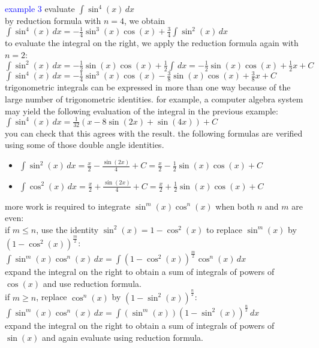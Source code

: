 \documentclass{article}
\begin{document}
\textcolor{blue}{example 3} evaluate $\int\sin^4(x)\,dx$\\
by reduction formula with $n = 4$, we obtain\\
$\int\sin^4(x)\,dx = -\frac{1}{4}\sin^3(x)\cos(x) + \frac{3}{4}\int\sin^2(x)\,dx$\\ to evaluate the integral on the right, we apply the reduction formula again with $n = 2$:\\ $\int\sin^2(x)\,dx = -\frac{1}{2}\sin(x)\cos(x) + \frac{1}{2}\int\,dx = -\frac{1}{2}\sin(x)\cos(x) + \frac{1}{2}x + C$\\ $\int\sin^4(x)\,dx = -\frac{1}{4}\sin^3(x)\cos(x) - \frac{3}{8}\sin(x)\cos(x) + \frac{3}{8}x + C$\\ trigonometric integrals can be expressed in more than one way because of the large number of trigonometric identities. for example, a computer algebra system may yield the following evaluation of the integral in the previous example:\\ $\int\sin^4(x)\,dx = \frac{1}{32}(x - 8\sin(2x) + \sin(4x)) + C$\\ you can check that this agrees with the result. the following formulas are verified using some of those double angle identities.
	\begin{itemize}
		\item $\int\sin^2(x)\,dx = \frac{x}{2} - \frac{\sin(2x)}{4} + C = \frac{x}{2} - \frac{1}{2}\sin(x)\cos(x) + C$
		\item $\int\cos^2(x)\,dx = \frac{x}{2} + \frac{\sin(2x)}{4} + C = \frac{x}{2} + \frac{1}{2}\sin(x)\cos(x) + C$ 
	\end{itemize}
more work is required to integrate $\sin^m(x)\cos^n(x)$ when both $n$ and $m$ are even:\\ if $m \leq n$, use the identity $\sin^2(x) = 1 - \cos^2(x)$ to replace $\sin^m(x)$ by $(1 - \cos^2(x))^{\frac{m}{2}}$:\\ $\int\sin^m(x)\cos^n(x)\,dx = \int(1 - \cos^2(x))^{\frac{m}{2}}\cos^n(x)\,dx$\\ expand the integral on the right to obtain a sum of integrals of powers of $\cos(x)$ and use reduction formula.\\ if $m \geq n$, replace $\cos^n(x)$ by $(1 - \sin^2(x))^{\frac{n}{2}}$:\\ $\int\sin^m(x)\cos^n(x)\,dx = \int(\sin^m(x))(1 - \sin^2(x))^{\frac{n}{2}}\,dx$\\ expand the integral on the right to obtain a sum of integrals of powers of $\sin(x)$ and again evaluate using reduction formula.\\
\end{document}
